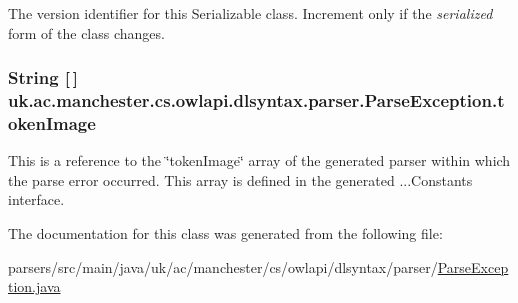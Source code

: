 The version identifier for this Serializable class. Increment only if the {\itshape serialized} form of the class changes. \hypertarget{classuk_1_1ac_1_1manchester_1_1cs_1_1owlapi_1_1dlsyntax_1_1parser_1_1_parse_exception_aac8150e07741c09056e6485d62785271}{
\subsubsection[{token\-Image}]{\setlength{\rightskip}{0pt plus 5cm}String \mbox{[}$\,$\mbox{]} uk.\-ac.\-manchester.\-cs.\-owlapi.\-dlsyntax.\-parser.\-Parse\-Exception.\-token\-Image}}\label{classuk_1_1ac_1_1manchester_1_1cs_1_1owlapi_1_1dlsyntax_1_1parser_1_1_parse_exception_aac8150e07741c09056e6485d62785271}
This is a reference to the \char`\"{}token\-Image\char`\"{} array of the generated parser within which the parse error occurred. This array is defined in the generated ...Constants interface. 

The documentation for this class was generated from the following file\-:\begin{DoxyCompactItemize}
\item 
parsers/src/main/java/uk/ac/manchester/cs/owlapi/dlsyntax/parser/\hyperlink{uk_2ac_2manchester_2cs_2owlapi_2dlsyntax_2parser_2_parse_exception_8java}{Parse\-Exception.\-java}\end{DoxyCompactItemize}
